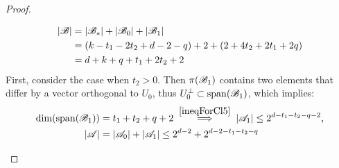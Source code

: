 \begin{proof}
\begin{enumerate}
\begin{enumerate}
\begin{enumerate}
                \begin{equation*}
                    \begin{split}
                        \left|{\mathscr{B}}\right|
                        & = \left|{\mathscr{B}}_*\right|+\left|{\mathscr{B}}_0\right|+\left|{\mathscr{B}}_1\right| \\
                        & = (k-t_1-2t_2+d-2-q)+2+(2+4t_2+2t_1+2q) \\ 
                        & = d + k + q + t_1 + 2t_2 + 2
                    \end{split}
                \end{equation*}
                First, consider the case when $t_2 > 0$. Then $\pi({\mathscr{B}}_1)$ contains two elements that differ by a vector orthogonal to $U_0$, thus $U_0^\bot\subset\operatorname{span}({\mathscr{B}}_1)$, which implies:
                \begin{equation*}
                    \begin{split}
                        \operatorname{dim}(\operatorname{span}({\mathscr{B}}_1)) &= t_1+t_2+q+2 \;\stackrel{\ref{ineqForCl5}}{\Longrightarrow}\; \left|{\mathscr{A}}_1\right|\leq2^{d-t_1-t_2-q-2}\text{,} \\
                    \left|{\mathscr{A}}\right| &= \left|{\mathscr{A}}_0\right| + \left|{\mathscr{A}}_1\right| \leq 2^{d-2} + 2^{d-2-t_1-t_2-q}
                    \end{split}  
                \end{equation*}
                

\end{enumerate}
\end{enumerate}
\end{enumerate}
\end{proof}

